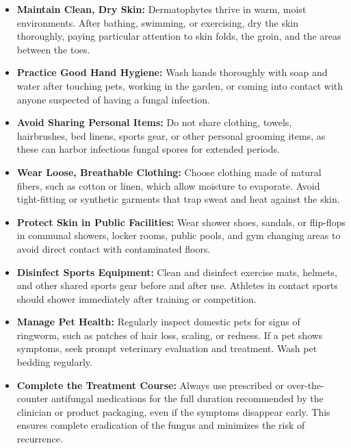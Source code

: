 \begin{itemize}
    \item \textbf{Maintain Clean, Dry Skin:} Dermatophytes thrive in warm, moist environments. After bathing, swimming, or exercising, dry the skin thoroughly, paying particular attention to skin folds, the groin, and the areas between the toes.
    \item \textbf{Practice Good Hand Hygiene:} Wash hands thoroughly with soap and water after touching pets, working in the garden, or coming into contact with anyone suspected of having a fungal infection.
    \item \textbf{Avoid Sharing Personal Items:} Do not share clothing, towels, hairbrushes, bed linens, sports gear, or other personal grooming items, as these can harbor infectious fungal spores for extended periods.
    \item \textbf{Wear Loose, Breathable Clothing:} Choose clothing made of natural fibers, such as cotton or linen, which allow moisture to evaporate. Avoid tight-fitting or synthetic garments that trap sweat and heat against the skin.
    \item \textbf{Protect Skin in Public Facilities:} Wear shower shoes, sandals, or flip-flops in communal showers, locker rooms, public pools, and gym changing areas to avoid direct contact with contaminated floors.
    \item \textbf{Disinfect Sports Equipment:} Clean and disinfect exercise mats, helmets, and other shared sports gear before and after use. Athletes in contact sports should shower immediately after training or competition.
    \item \textbf{Manage Pet Health:} Regularly inspect domestic pets for signs of ringworm, such as patches of hair loss, scaling, or redness. If a pet shows symptoms, seek prompt veterinary evaluation and treatment. Wash pet bedding regularly.
    \item \textbf{Complete the Treatment Course:} Always use prescribed or over-the-counter antifungal medications for the full duration recommended by the clinician or product packaging, even if the symptoms disappear early. This ensures complete eradication of the fungus and minimizes the risk of recurrence.
\end{itemize}

